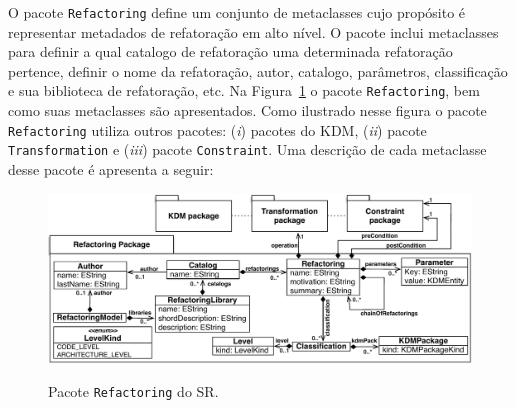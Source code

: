 O pacote \texttt{Refactoring} define um conjunto de metaclasses cujo propósito é representar metadados de refatoração em alto nível. O pacote inclui metaclasses para definir a qual catalogo de refatoração uma determinada refatoração pertence, definir o nome da refatoração, autor, catalogo, parâmetros, classificação e sua biblioteca de refatoração, etc. Na Figura~\ref{fig:pacote_refactoring_srm} o pacote \texttt{Refactoring}, bem como suas metaclasses são apresentados. Como ilustrado nesse figura o pacote \texttt{Refactoring} utiliza outros pacotes: (\textit{i}) pacotes do KDM, (\textit{ii}) pacote \texttt{Transformation} e (\textit{iii}) pacote \texttt{Constraint}. Uma descrição de cada metaclasse desse pacote é apresenta a seguir: 

\begin{figure}[h]
	\centering
		\caption{Pacote \texttt{Refactoring} do SR.}
	\includegraphics[scale=0.70]{images/pacoteRefactoring}
	\label{fig:pacote_refactoring_srm}
	\fautor
\end{figure}

